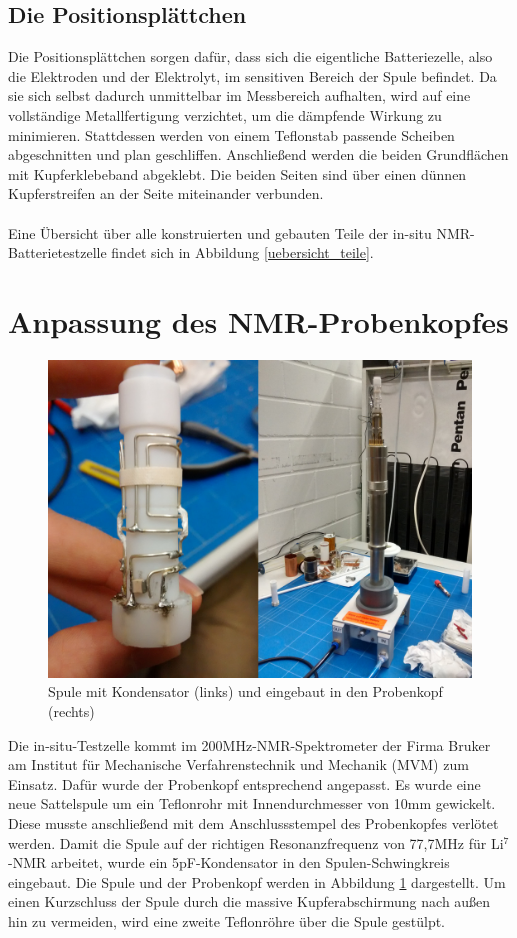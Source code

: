 \documentclass[a4paper, 11pt, headsepline,footsepline,twoside,abstract]{scrbook}
\begin{document}
\subsection{Die Positionsplättchen}
Die Positionsplättchen sorgen dafür, dass sich die eigentliche Batteriezelle, also die Elektroden und der Elektrolyt, im sensitiven Bereich der Spule befindet. Da sie sich selbst dadurch unmittelbar im Messbereich aufhalten, wird auf eine vollständige Metallfertigung verzichtet, um die dämpfende Wirkung zu minimieren. Stattdessen werden von einem Teflonstab passende Scheiben abgeschnitten und plan geschliffen. Anschließend werden die beiden Grundflächen mit Kupferklebeband abgeklebt. Die beiden Seiten sind über einen dünnen Kupferstreifen an der Seite miteinander verbunden. 
\\\\
Eine Übersicht über alle konstruierten und gebauten Teile der in-situ NMR-Batterietestzelle findet sich in Abbildung \ref{uebersicht_teile}.
\section{Anpassung des NMR-Probenkopfes}
\begin{figure}
	\centering
	\includegraphics[width=0.85\columnwidth]{images/Platzhalter_Spule.jpg}
	\caption{Spule mit Kondensator (links) und eingebaut in den Probenkopf (rechts)}
	\label{spule}
\end{figure}
Die in-situ-Testzelle kommt im 200MHz-NMR-Spektrometer der Firma Bruker am Institut für Mechanische Verfahrenstechnik und Mechanik (MVM) zum Einsatz. Dafür wurde der Probenkopf entsprechend angepasst. Es wurde eine neue Sattelspule um ein Teflonrohr mit Innendurchmesser von 10mm gewickelt. Diese musste anschließend mit dem Anschlussstempel des Probenkopfes verlötet werden. Damit die Spule auf der richtigen Resonanzfrequenz von 77,7MHz für Li$^7$-NMR arbeitet, wurde ein 5pF-Kondensator in den Spulen-Schwingkreis eingebaut. Die Spule und der Probenkopf werden in Abbildung \ref{spule} dargestellt. Um einen Kurzschluss der Spule durch die massive Kupferabschirmung nach außen hin zu vermeiden, wird eine zweite Teflonröhre über die Spule gestülpt.
\end{document}
